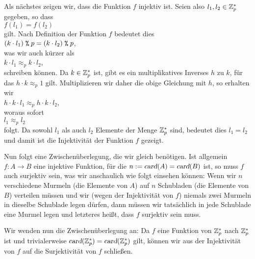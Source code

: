 Als nächstes zeigen wir, dass die Funktion $f$ injektiv ist.  Seien also $l_1, l_2 \in \mathbb{Z}_{p}^*$
gegeben, so dass
\\[0.2cm]
\hspace*{1.3cm}
$f(l_1) = f(l_2)$
\\[0.2cm]
gilt.  Nach Definition der Funktion $f$ bedeutet dies
\\[0.2cm]
\hspace*{1.3cm}
$(k \cdot l_1) \;\texttt{\%}\; p = (k \cdot l_2) \;\texttt{\%}\; p$, 
\\[0.2cm]
was wir auch kürzer als
\\[0.2cm]
\hspace*{1.3cm}
$k \cdot l_1 \approx_p k \cdot l_2$, 
\\[0.2cm]
schreiben können.  Da $k \in \mathbb{Z}_{p}^*$ ist, gibt es ein multiplikatives Inverses $h$ zu $k$, für das
$h \cdot k \approx_p 1$ gilt.  Multiplizieren wir daher die obige Gleichung mit $h$, so erhalten wir
\\[0.2cm]
\hspace*{1.3cm}
$h \cdot k \cdot l_1 \approx_p h \cdot k \cdot l_2$, 
\\[0.2cm] 
woraus sofort
\\[0.2cm]
\hspace*{1.3cm}
$l_1 \approx_p l_2$ 
\\[0.2cm]
folgt.  Da sowohl $l_1$ als auch $l_2$ Elemente der Menge $\mathbb{Z}_{p}^*$ sind, bedeutet dies $l_1 = l_2$ und
damit ist die Injektivität der Funktion $f$ gezeigt.
\vspace*{0.3cm}

Nun folgt eine Zwischenüberlegung, die wir gleich benötigen.
Ist allgemein $f: A \rightarrow B$ eine injektive Funktion, für die $n := \textsl{card}(A) = \textsl{card}(B)$ 
ist, so muss $f$ auch surjektiv sein, was wir anschaulich wie folgt einsehen können:
Wenn wir $n$ verschiedene Murmeln (die Elemente von $A$) auf $n$ Schubladen (die Elemente von $B$)
verteilen müssen und wir (wegen der Injektivität von $f$) niemals zwei Murmeln in dieselbe
Schublade legen dürfen, dann müssen wir tatsächlich in jede Schublade eine Murmel legen und
letzteres heißt, dass $f$ surjektiv sein muss.
\vspace*{0.3cm}

Wir wenden nun die Zwischenüberlegung an:
Da $f$ eine Funktion von $\mathbb{Z}_{p}^*$ nach $\mathbb{Z}_{p}^*$ ist und trivialerweise $\textsl{card}(\mathbb{Z}_{p}^*)=\textsl{card}(\mathbb{Z}_{p}^*)$
gilt, können wir aus der Injektivität von $f$ auf die Surjektivität von $f$ schließen.
\vspace*{0.2cm}

